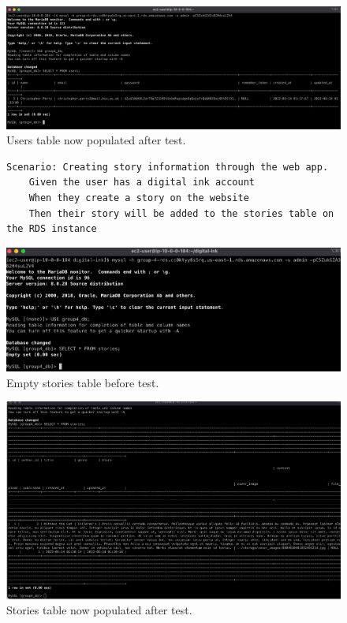 \begin{figure}[!htbp]
    \centering
    \includegraphics[width=\textwidth]{resources/rds/rds-testing-user-added}
    \caption{Users table now populated after test.}
    \label{fig:rds-testing-user-added}
\end{figure}

\clearpage
\begin{figure}[!htbp]
    \centering
    \begin{verbatim}
Scenario: Creating story information through the web app.
    Given the user has a digital ink account
    When they create a story on the website
    Then their story will be added to the stories table on the RDS instance
    \end{verbatim}
    \label{fig:create-story-data}
\end{figure}

\begin{figure}[!htbp]
    \centering
    \includegraphics[width=\textwidth]{resources/rds/rds-testing-stories-before}
    \caption{Empty stories table before test.}
    \label{fig:rds-testing-stories-empty}
\end{figure}

\begin{figure}[!htbp]
    \centering
    \includegraphics[width=\textwidth]{resources/rds/rds-testing-stories-after}
    \caption{Stories table now populated after test.}
    \label{fig:rds-testing-story-added}
\end{figure}


